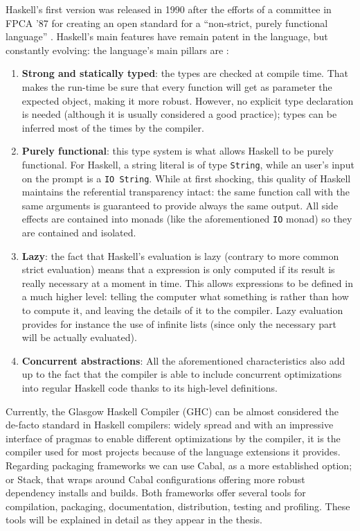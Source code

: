 Haskell's first version was released in 1990 after the efforts of a committee
in FPCA '87 for creating an open standard for a ``non-strict, purely functional
language'' \cite{haskell-history}. Haskell's main features have remain patent
in the language, but constantly evolving: the language's main pillars are
\cite{haskell-98, haskell-2010}:

\begin{enumerate}
\item \textbf{Strong and statically typed}: the types are checked at compile
  time. That makes the run-time be sure that every function will get as
  parameter the expected object, making it more robust. However, no explicit
  type declaration is needed (although it is usually considered a good
  practice); types can be inferred most of the times by the compiler.
\item \textbf{Purely functional}: this type system is what allows Haskell to be
  purely functional. For Haskell, a string literal is of type \texttt{String},
  while an user's input on the prompt is a \texttt{IO String}. While at first
  shocking, this quality of Haskell maintains the referential transparency
  intact: the same function call with the same arguments is guaranteed to
  provide always the same output. All side effects are contained into monads
  (like the aforementioned \texttt{IO} monad) so they are contained and
  isolated.
\item \textbf{Lazy}: the fact that Haskell's evaluation is lazy (contrary to
  more common strict evaluation) means that a expression is only computed if
  its result is really necessary at a moment in time. This allows expressions
  to be defined in a much higher level: telling the computer what something is
  rather than how to compute it, and leaving the details of it to the compiler.
  Lazy evaluation provides for instance the use of infinite lists (since only
  the necessary part will be actually evaluated).
\item \textbf{Concurrent abstractions}: All the aforementioned characteristics
  also add up to the fact that the compiler is able to include concurrent
  optimizations into regular Haskell code thanks to its high-level definitions.
\end{enumerate}

Currently, the Glasgow Haskell Compiler (GHC) can be almost considered the
de-facto standard in Haskell compilers: widely spread and with an impressive
interface of pragmas to enable different optimizations by the compiler, it is
the compiler used for most projects because of the language extensions it
provides. Regarding packaging frameworks we can use Cabal, as a more
established option; or Stack, that wraps around Cabal configurations offering
more robust dependency installs and builds. Both frameworks offer several tools
for compilation, packaging, documentation, distribution, testing and profiling.
These tools will be explained in detail as they appear in the thesis.\\

